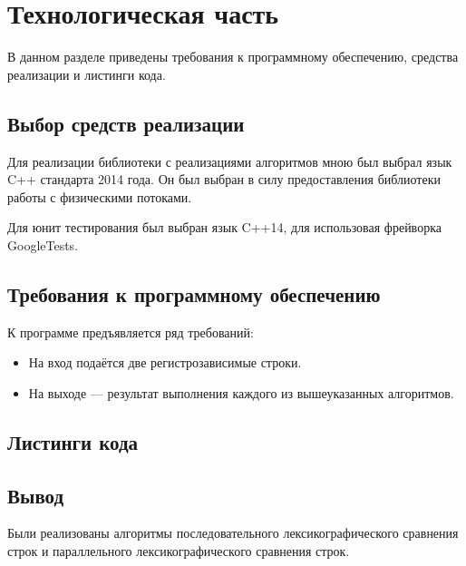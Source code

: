 \chapter{Технологическая часть}

    В данном разделе приведены требования к программному обеспечению, средства реализации и листинги кода.
    
    \section{Выбор средств реализации}
        
        Для реализации библиотеки с реализациями алгоритмов мною был выбрал язык C++\cite{cppstd} стандарта 2014 года. Он был выбран в силу предоставления библиотеки работы с физическими потоками.
        
        Для юнит тестирования был выбран язык C++14, для использовая фрейворка GoogleTests\cite{gtests}.
    
    \section{Требования к программному обеспечению}
    
        К программе предъявляется ряд требований:
        
        \begin{itemize}
            \item На вход подаётся две регистрозависимые строки.
            \item На выходе — результат выполнения каждого из вышеуказанных алгоритмов.
        \end{itemize}
    
    \clearpage
    
    \section{Листинги кода}
    
        
        
        
        
        \newpage
        
        
        
    \section*{Вывод}
    
        Были реализованы алгоритмы последовательного лексикографического сравнения строк и параллельного лексикографического сравнения строк.